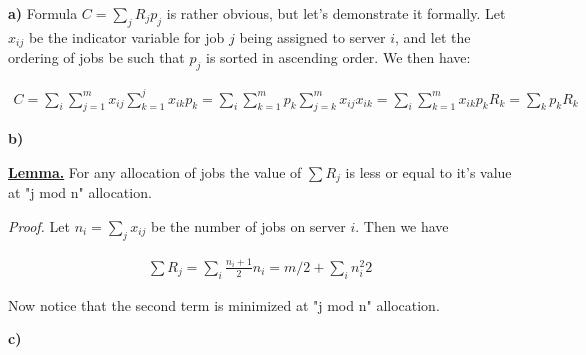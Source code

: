 \textbf{a)} Formula $C=\sum_j R_j p_j$ is rather obvious, but let's demonstrate it formally. Let $x_{ij}$ be the indicator variable for job $j$ being assigned to server $i$, and let the ordering of jobs be such that $p_j$ is sorted in ascending order. We then have:

\begin{align*}
C = \sum_i \sum_{j=1}^m x_{ij}\sum_{k=1}^j x_{ik}p_k = \sum_i \sum_{k=1}^m p_k \sum_{j=k}^m x_{ij}x_{ik} = \sum_i \sum_{k=1}^m x_{ik} p_k R_k = \sum_k p_k R_k
\end{align*}

\textbf{b)}

\uline{\textbf{Lemma.}} For any allocation of jobs the value of $\sum R_j$ is less or equal to it's value at "j mod n" allocation. 

\textit{Proof.} Let $n_i=\sum_j x_{ij}$ be the number of jobs on server $i$. Then we have

\begin{align*}
\sum R_j = \sum_i \frac{n_i+1}{2} n_i = m/2 + \sum_i {n_i^2}{2}
\end{align*}

Now notice that the second term is minimized at "j mod n" allocation. 

\textbf{c)}